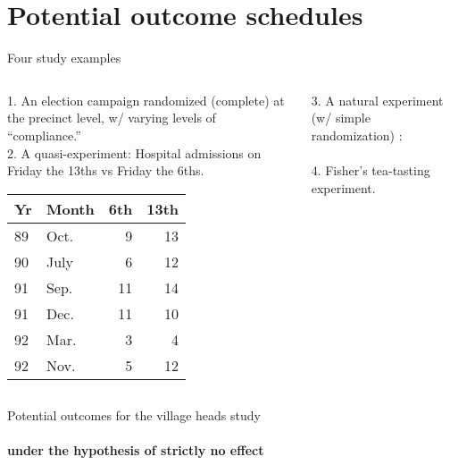 \section{Potential outcome schedules}

\begin{frame}{Four study examples} 


\begin{columns}
\begin{Column}
1. An election campaign randomized (complete) at the precinct level, w/ varying
levels of ``compliance.''\\[2ex]
 2. A quasi-experiment: Hospital admissions on Friday the 13ths vs
Friday the 6ths.\\
{\small
\begin{tabular}{ll|rr} \hline
Yr & Month &	6th &	13th \\ \hline
89 & Oct. &	9 &	13 \\
90 & July &	6 &	12 \\
91 & Sep. &11 &	14 \\
91 & Dec. &	11 &	10 \\
92 & Mar. &	3 &	4 \\
92 & Nov. &	5 &	12 \\ \hline
\end{tabular}
}
\end{Column}
\begin{Column}

3. A natural experiment (w/ simple randomization)%
:
\\
        \\[2ex]

4. Fisher's tea-tasting experiment. 

\end{Column}
\end{columns}

  
\end{frame}

\begin{frame}{Potential outcomes for the village heads study}
\framesubtitle{under     the hypothesis of     strictly no effect}
  
\end{frame}

